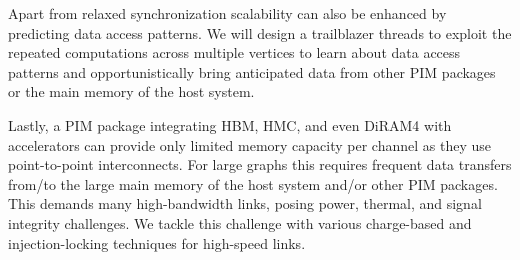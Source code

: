Apart from relaxed synchronization scalability can also be enhanced by predicting data access patterns. 
We will design a trailblazer threads to exploit the repeated computations across multiple vertices to learn about data access patterns and opportunistically bring anticipated data from other PIM packages or the main memory of the host system.

Lastly, a PIM package integrating HBM, HMC, and even DiRAM4 with accelerators can provide only limited memory capacity per channel as they use point-to-point interconnects.  
For large graphs this requires frequent data transfers from/to the large main memory of the host system and/or other PIM packages.  
This demands many high-bandwidth links, posing power, thermal, and signal integrity challenges.  
We tackle this challenge with various charge-based and injection-locking techniques for high-speed links.

